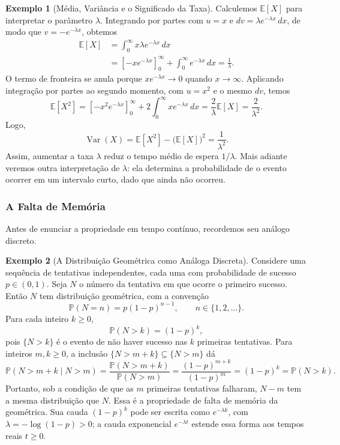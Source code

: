 \documentclass[12pt,portuguese]{article}
\theoremstyle{definition}
\newtheorem{example}[example]{Exemplo}
\theoremstyle{plainexercise}
\theoremstyle{starredexercise}
\theoremstyle{definition}
\begin{document}
\begin{example}[Média, Variância e o Significado da Taxa]\label{ex:media-variancia-exponencial}
Calculemos $\mathbb{E}[X]$ para interpretar o parâmetro $\lambda$.
Integrando por partes com $u=x$ e $dv=\lambda e^{-\lambda x}\,dx$, de
modo que $v=-e^{-\lambda x}$, obtemos
\begin{align*}
  \mathbb{E}[X]
  &=\int_0^{\infty}x\lambda e^{-\lambda x}\,dx
  \\[0.3cm]
  &=\left[-xe^{-\lambda x}\right]_0^{\infty}
    +\int_0^{\infty}e^{-\lambda x}\,dx
  =\frac{1}{\lambda}.
\end{align*}
O termo de fronteira se anula porque $xe^{-\lambda x}\to0$ quando
$x\to\infty$. Aplicando integração por partes ao segundo momento,
com $u=x^2$ e o mesmo $dv$, temos
\[
  \mathbb{E}[X^2]
  =\left[-x^2e^{-\lambda x}\right]_0^{\infty}
    +2\int_0^{\infty}xe^{-\lambda x}\,dx
  =\frac{2}{\lambda}\mathbb{E}[X]=\frac{2}{\lambda^2}.
\]
Logo,
\[
  \operatorname{Var}(X)
  =\mathbb{E}[X^2]-\bigl(\mathbb{E}[X]\bigr)^2
  =\frac{1}{\lambda^2}.
\]
Assim, aumentar a taxa $\lambda$ reduz o tempo médio de espera
$1/\lambda$. Mais adiante veremos outra interpretação de $\lambda$:
ela determina a probabilidade de o evento ocorrer em um intervalo curto,
dado que ainda não ocorreu.
\end{example}

\subsubsection{A Falta de Memória}

Antes de enunciar a propriedade em tempo contínuo, recordemos seu análogo
discreto.

\begin{example}[A Distribuição Geométrica como Análoga Discreta]\label{ex:geometrica-sem-memoria}
Considere uma sequência de tentativas independentes, cada uma com
probabilidade de sucesso $p\in(0,1)$. Seja $N$ o número da tentativa em
que ocorre o primeiro sucesso. Então $N$ tem distribuição geométrica,
com a convenção
\[
  \mathbb{P}(N=n)=p(1-p)^{n-1},\qquad n\in\{1,2,\ldots\}.
\]
Para cada inteiro $k\geqslant0$,
\[
  \mathbb{P}(N>k)=(1-p)^k,
\]
pois $\{N>k\}$ é o evento de não haver sucesso nas $k$ primeiras
tentativas. Para inteiros $m,k\geqslant0$, a inclusão
$\{N>m+k\}\subseteq\{N>m\}$ dá
\[
  \mathbb{P}(N>m+k\mid N>m)
  =\frac{\mathbb{P}(N>m+k)}{\mathbb{P}(N>m)}
  =\frac{(1-p)^{m+k}}{(1-p)^m}
  =(1-p)^k=\mathbb{P}(N>k).
\]
Portanto, sob a condição de que as $m$ primeiras tentativas falharam,
$N-m$ tem a mesma distribuição que $N$. Essa é a propriedade de falta de
memória da geométrica. Sua cauda $(1-p)^k$ pode ser escrita como
$e^{-\lambda k}$, com $\lambda=-\log(1-p)>0$; a cauda exponencial
$e^{-\lambda t}$ estende essa forma aos tempos reais $t\geqslant0$.
\end{example}
\end{document}

